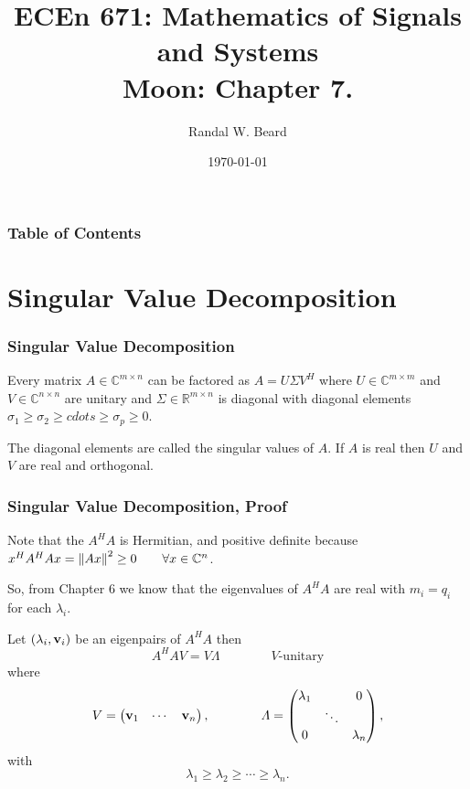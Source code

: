 \documentclass{beamer}
\title{ECEn 671: Mathematics of Signals and Systems \\ 
Moon: Chapter 7.}
\author{Randal W. Beard}
\institute{Brigham Young University}
\date{\today}
\begin{document}
\begin{frame}
	\titlepage
\end{frame}

\begin{frame}[t]
\frametitle{Table of Contents}
\tableofcontents
\end{frame}

\section{Singular Value Decomposition}
\frame{\sectionpage}


\begin{frame}\frametitle{Singular Value Decomposition}
	\begin{theorem}
		Every matrix $A \in \mathbb{C}^{m\times n}$ can be factored as $A = U\Sigma V^H$ where $U \in \mathbb{C}^{m\times m}$ and $V \in \mathbb{C}^{n\times n}$ are unitary and $\Sigma \in \mathbb{R}^{m\times n}$ is diagonal with diagonal elements $\sigma_1 \geq \sigma_2 \geq cdots \geq \sigma_p \geq 0$.
	\end{theorem}
	
	\vfill
		
	The diagonal elements are called the singular values of $A$.  If $A$ is real then $U$ and $V$ are real and orthogonal.
\end{frame}

\begin{frame}\frametitle{Singular Value Decomposition, Proof}
	Note that the $A^HA$ is Hermitian, and positive definite because $x^HA^HAx = \left\|Ax \right\|^2 \geq 0 \qquad \forall x\in\mathbb{C}^n$.
	
	\vfill
	
	So, from Chapter 6 we know that the eigenvalues of $A^HA$ are real with $m_i = q_i$ for each $\lambda_i$.  
	
	\vfill
	
	Let $(\lambda_i,\mathbf{v}_i)$ be an eigenpairs of $A^HA$ then
	\[ 
		A^HAV = V\Lambda \qquad \qquad V \text{-unitary} 
	\]
	where 
	\[
		V = \begin{pmatrix}
	    		\mathbf{v}_1 & \cdots & \mathbf{v}_n
			\end{pmatrix}, 
		\qquad \qquad
		\Lambda = \begin{pmatrix}
	    			\lambda_1 & & 0\\
	   		 		& \ddots &\\
	    			0 & & \lambda_n
	  			  \end{pmatrix}, 
	  \]
	  with
	  \[
	  	\lambda_1 \geq \lambda_2 \geq \cdots \geq \lambda_n.
	  \]
	
\end{frame}
\end{document}

